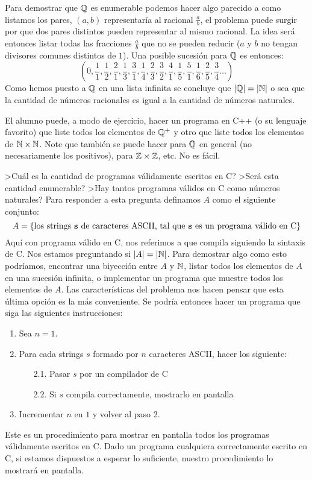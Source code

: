 \begin{teorema}
\begin{demostracion}
Para demostrar que $\mathbb{Q}$ es enumerable podemos hacer algo parecido a como listamos los pares, $(a,b)$ representaría al racional $\frac{a}{b}$, el problema puede surgir por que dos pares distintos pueden representar al mismo racional. 
La idea será entonces listar todas las fracciones $\frac{a}{b}$ que no se pueden reducir ($a$ y $b$ no tengan divisores comunes distintos de $1$).
Una posible sucesión para $\mathbb{Q}$ es entonces:
\[
\left(0,\frac{1}{1},\frac{1}{2},\frac{2}{1},\frac{1}{3},\frac{3}{1},\frac{1}{4},\frac{2}{3},\frac{3}{2},\frac{4}{1},\frac{1}{5},\frac{5}{1},\frac{1}{6},\frac{2}{5},\frac{3}{4}\ldots\right)
\]
Como hemos puesto a $\mathbb{Q}$ en una lista infinita se concluye que $|\mathbb{Q}|=|\mathbb{N}|$ o sea que la cantidad de números racionales es igual a la cantidad de números naturales.
\end{demostracion}
\end{teorema}

El alumno puede, a modo de ejercicio, hacer un programa en C++ (o su lenguaje favorito) que liste todos los elementos de $\mathbb{Q}^+$ y otro que liste todos los elementos de $\mathbb{N}\times\mathbb{N}$. Note que también se puede hacer para $\mathbb{Q}$ en general (no necesariamente los positivos), para $\mathbb{Z}\times \mathbb{Z}$, etc. No es fácil.

\begin{ejemplo}
>Cuál es la cantidad de programas válidamente escritos en C?
>Será esta cantidad enumerable?
>Hay tantos programas válidos en C como números naturales?
Para responder a esta pregunta definamos $A$ como el siguiente conjunto:
\[
A=\{\text{los strings \texttt{s} de caracteres ASCII, tal que \texttt{s} es un programa válido en C}\}
\]
Aquí con programa válido en C, nos referimos a que compila siguiendo la sintaxis de C.
Nos estamos preguntando si $|A|=|\mathbb{N}|$.
Para demostrar algo como esto podríamos, encontrar una biyección entre $A$ y $\mathbb{N}$, listar todos los elementos de $A$ en una sucesión infinita, o implementar un programa que muestre todos los elementos de $A$.
Las características del problema nos hacen pensar que esta última opción es la m\'as conveniente.
Se podría entonces hacer un programa que siga las siguientes instrucciones:
\begin{enumerate}
  \itemsep 0pt
  \item Sea $n=1$.
  \item Para cada strings $s$ formado por $n$ caracteres ASCII, hacer los siguiente:
  \begin{enumerate}
    \itemsep 0pt
    \item[2.1.] Pasar $s$ por un compilador de C
    \item[2.2.] Si $s$ compila correctamente, mostrarlo en pantalla
  \end{enumerate}
  \item Incrementar $n$ en $1$ y volver al paso 2.
\end{enumerate}
Este es un procedimiento para mostrar en pantalla todos los programas válidamente escritos en C.
Dado un programa cualquiera correctamente escrito en C, si estamos dispuestos a esperar lo suficiente, nuestro procedimiento lo mostrará en pantalla.
\end{ejemplo}

